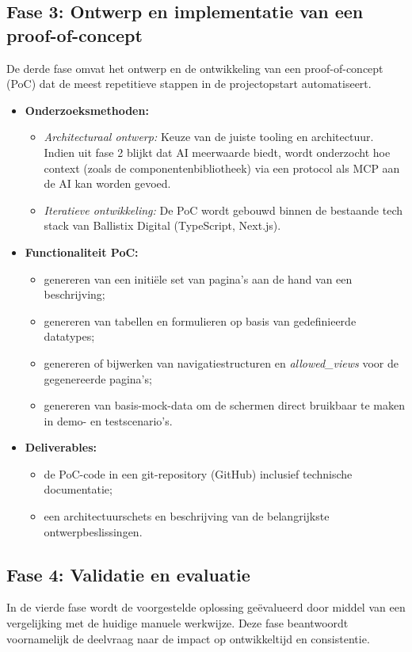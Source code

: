 \subsection*{Fase 3: Ontwerp en implementatie van een proof-of-concept}
De derde fase omvat het ontwerp en de ontwikkeling van een proof-of-concept (PoC) dat de meest repetitieve stappen in de projectopstart automatiseert.

\begin{itemize}
  \item \textbf{Onderzoeksmethoden:}
        \begin{itemize}
          \item \emph{Architecturaal ontwerp:} Keuze van de juiste tooling en architectuur. Indien uit fase 2 blijkt dat AI meerwaarde biedt, wordt onderzocht hoe context (zoals de componentenbibliotheek) via een protocol als MCP aan de AI kan worden gevoed.
          \item \emph{Iteratieve ontwikkeling:} De PoC wordt gebouwd binnen de bestaande tech stack van Ballistix Digital (TypeScript, Next.js).
        \end{itemize}
  \item \textbf{Functionaliteit PoC:}
        \begin{itemize}
          \item genereren van een initiële set van pagina's aan de hand van een beschrijving;
          \item genereren van tabellen en formulieren op basis van gedefinieerde datatypes;
          \item genereren of bijwerken van navigatiestructuren en \emph{allowed\_views} voor de gegenereerde pagina's;
          \item genereren van basis-mock-data om de schermen direct bruikbaar te maken in demo- en testscenario's.
        \end{itemize}
  \item \textbf{Deliverables:}
        \begin{itemize}
          \item de PoC-code in een git-repository (GitHub) inclusief technische documentatie;
          \item een architectuurschets en beschrijving van de belangrijkste ontwerpbeslissingen.
        \end{itemize}
\end{itemize}

\subsection*{Fase 4: Validatie en evaluatie}
In de vierde fase wordt de voorgestelde oplossing geëvalueerd door middel van een vergelijking met de huidige manuele werkwijze. Deze fase beantwoordt voornamelijk de deelvraag naar de impact op ontwikkeltijd en consistentie.

